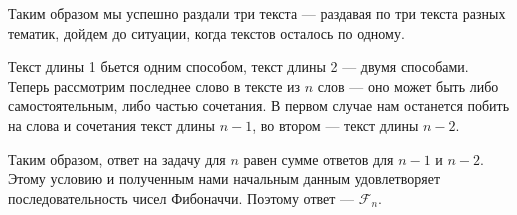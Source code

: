 \begin{itemize}
{Таким образом мы успешно раздали три текста — раздавая по три текста разных тематик, дойдем до ситуации, когда текстов осталось по одному.
} \fi

\itC Текст длины 1 бьется одним способом, текст длины 2 — двумя способами. Теперь рассмотрим последнее слово в тексте из $n$ слов — оно может быть либо самостоятельным, либо частью сочетания. В первом случае нам останется побить на слова и сочетания текст длины $n-1$, во втором — текст длины $n-2$.

Таким образом, ответ на задачу для $n$ равен сумме ответов для $n-1$ и $n-2$. Этому условию и полученным нами начальным данным удовлетворяет последовательность чисел Фибоначчи. Поэтому ответ — $\mathcal{F}_n$.

\end{itemize}